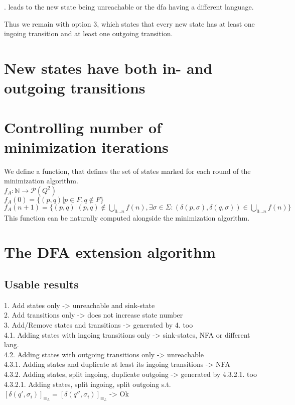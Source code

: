 \documentclass[a4paper, oneside, 11pt]{report}
\theoremstyle{definition}
\theoremstyle{remark}
\begin{document}
. leads to the new state being unreachable or the dfa having a different language.

Thus we remain with option 3, which states that every new state has at least one ingoing transition and at least one outgoing transition.

\section{New states have both in- and outgoing transitions}

\section{Controlling number of minimization iterations}

We define a function, that defines the set of states marked for each round of the minimization algorithm. \\
$f_A \colon \mathbb{N} \to \mathcal{P}(Q^2)$ \\
$f_A(0) = \{ (p,q) | p \in F, q \notin F \}$ \\
$f_A(n+1) = \{ (p,q) | (p,q) \notin \bigcup\limits_{0 \dots n}f(n), \exists \sigma \in \Sigma \colon (\delta(p,\sigma), \delta(q,\sigma)) \in \bigcup\limits_{0 \dots n}f(n)\}$ \\
This function can be naturally computed alongside the minimization algorithm.


\section{The DFA extension algorithm}

\subsection{Usable results}

1. Add states only -> unreachable and sink-state \\
2. Add transitions only -> does not increase state number \\
3. Add/Remove states and transitions -> generated by 4. too \\
4.1. Adding states with ingoing transitions only -> sink-states, NFA or different lang. \\
4.2. Adding states with outgoing transitions only -> unreachable \\
4.3.1. Adding states and duplicate at least its ingoing transitions -> NFA \\
4.3.2. Adding states, split ingoing, duplicate outgoing -> generated by 4.3.2.1. too \\
4.3.2.1. Adding states, split ingoing, split outgoing s.t. $[\delta(q', \sigma_i)]_{\equiv_L} = [\delta(q'', \sigma_i)]_{\equiv_L}$ -> Ok
\end{document}
